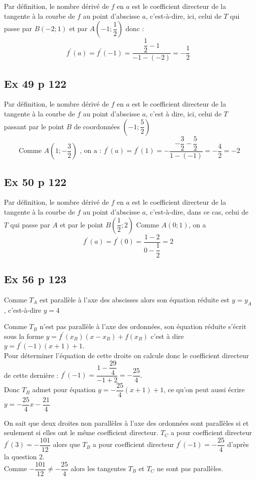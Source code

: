 \documentclass[12pt,a5paper]{book}
\begin{document}
Par définition, le nombre dérivé de $f$ en $a$ est le coefficient directeur de la tangente à la courbe de $f$
au point d'abscisse $a$, c'est-à-dire, ici, celui de $T$ qui passe par $B(-2 ; 1)$ et par $A\left(-1 ; \dfrac{1}{2}\right)$
donc :
$$
f^{\prime}(a)=f^{\prime}(-1)=\dfrac{\dfrac{1}{2}-1}{-1-(-2)}=-\dfrac{1}{2}
$$

\subsection*{Ex 49 p 122}

Par définition, le nombre dérivé de $f$ en $a$ est le coefficient directeur de la tangente à la courbe de $f$
au point d'abscisse $a$, c'est à dire, ici, celui de $T$ passant par le point $B$ de coordonnées $\left(-1 ; \dfrac{5}{2}\right)$
$$
\text { Comme } A\left(1 ;-\dfrac{3}{2}\right) \text { , on a : } f^{\prime}(a)=f^{\prime}(1)=-\dfrac{-\dfrac{3}{2}-\dfrac{5}{2}}{1-(-1)}=-\dfrac{4}{2}=-2
$$

\subsection*{Ex 50 p 122}

Par définition, le nombre dérivé de $f$ en $a$ est le coefficient directeur de la tangente à la courbe de $f$
au point d'abscisse $a$, c'est-à-dire, dans ce cas, celui de $T$ qui passe par $A$ et par le point $B\left(\dfrac{1}{2} ; 2\right)$
Comme $A(0 ; 1)$, on a
$$
f^{\prime}(a)=f^{\prime}(0)=\dfrac{1-2}{0-\dfrac{1}{2}}=2
$$


\subsection*{Ex 56 p 123}

\begin{enumMet}
    \item Comme $T_{A}$ est parallèle à l'axe des abscisses alors son équation réduite est $y=y_{A}$, c'est-à-dire $y=4$
    \item Comme $T_{B}$ n'est pas parallèle à l'axe des ordonnées, son équation réduite s'écrit sous la forme $y=f^{\prime}\left(x_{B}\right)\left(x-x_{B}\right)+f\left(x_{B}\right)$ c'est à dire $y=f^{\prime}(-1)(x+1)+1$.\\
    Pour déterminer l'équation de cette droite on calcule donc le coefficient directeur de cette dernière :
    $f^{\prime}(-1)=\dfrac{1-\dfrac{29}{4}}{-1+2}=-\dfrac{25}{4}$.\\
Donc $T_{B}$ admet pour équation $y=-\dfrac{25}{4}(x+1)+1$, ce qu'on
peut aussi écrire $y=-\dfrac{25}{4} x-\dfrac{21}{4}$
    \item On sait que deux droites non parallèles à l'axe des ordonnées sont parallèles si et seulement si elles ont le même coefficient directeur. $T_{C}$ a pour coefficient directeur $f^{\prime}(3)=-\dfrac{101}{12}$ alors 
que $T_{B}$ a pour coefficient directeur $f^{\prime}(-1)=-\dfrac{25}{4}$ d'après la question 2.\\
Comme $-\dfrac{101}{12} \neq-\dfrac{25}{4}$ alors les tangentes $T_{B}$ et $T_{C}$ ne sont pas parallèles.
\end{enumMet}
\end{document}
